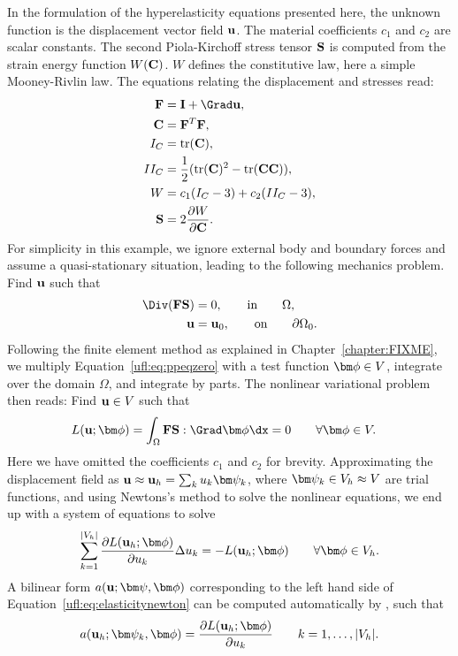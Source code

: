 In the formulation of the hyperelasticity equations presented here,
the unknown function is the displacement vector field $\mathbf{u}$.  The
material coefficients $c_1$ and $c_2$ are scalar constants.  The
second Piola-Kirchoff stress tensor $\mathbf{S}$ is computed from the strain
energy function $W(\mathbf{C})$. $W$ defines the constitutive law, here a
simple Mooney-Rivlin law. The equations relating the displacement and
stresses read:
\begin{align}
\begin{split}
\FF   &=  \II + \Grad \uu, \\
\CC   &=  \FF^T\FF, \\
I_C   &=  \mop{tr}(\CC), \\
II_C  &=  \frac 1 2 (\mop{tr}(\CC)^2 - \mop{tr}(\CC\CC)), \\
W     &=  c_1(I_C - 3) + c_2(II_C - 3), \\
\SS   &=  2\frac{\partial W}{\partial\CC}.  \label{ufl:eq:hypdef}
\end{split}
\end{align}
For simplicity in this example, we ignore external body and boundary
forces and assume a quasi-stationary situation, leading to the
following mechanics problem. Find $\mathbf{u}$ such that
\begin{align}
\begin{split}
\Div (\FF\SS) &= 0, \qquad \mbox{in} \qquad\Omega, \label{ufl:eq:ppeqzero} \\
\uu &= \uu_0,       \qquad \mbox{on} \qquad\partial\Omega_0.
\end{split}
\end{align}
Following the finite element method as explained in
Chapter~\ref{chapter:FIXME}, we multiply
Equation~\eqref{ufl:eq:ppeqzero} with a test function $\bphi \in V$,
integrate over the domain $\Omega$, and integrate by parts.
The nonlinear variational problem then reads: Find $\mathbf{u} \in V$ such that
\begin{align}
L(\uu; \bphi) &= \int_\Omega \FF\SS : \Grad\bphi \dx = 0
  \qquad \forall \bphi \in V. \label{ufl:eq:hypdefL}
\end{align}
Here we have omitted the coefficients $c_1$ and $c_2$ for brevity.
Approximating the displacement field as $\uu \approx \uu_h = \sum_k
u_k \bpsi_k$, where $\bpsi_k \in V_h \approx V$ are trial functions,
and using Newtons's method to solve the nonlinear equations, we end up
with a system of equations to solve
\begin{align}
\sum_{k=1}^{|V_h|} \frac{\partial L(\uu_h; \bphi)}{\partial u_k} \Delta u_k =
  -L(\uu_h; \bphi)
  \qquad \forall \bphi \in V_h. \label{ufl:eq:elasticitynewton}
\end{align}
A bilinear form $a(\uu; \bpsi, \bphi)$ corresponding to the left hand side of Equation~\eqref{ufl:eq:elasticitynewton} can be computed automatically
by \ufl{}, such that
\begin{align}
a(\uu_h; \bpsi_k, \bphi) = \frac{\partial L(\uu_h; \bphi)}{\partial u_k}
  \qquad k = 1, \ldots, |V_h|. \label{ufl:eq:hypdefa}
\end{align}

